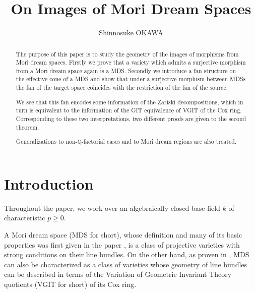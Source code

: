 \documentclass[12pt,twoside]{amsart}
\theoremstyle{definition}
\newcommand\bq{\mathbb{Q}}
\begin{document}
 \title[]{On Images of Mori Dream Spaces}
 \author{Shinnosuke OKAWA}
 \address{Graduate School of Mathematical Sciences, 
the University of Tokyo, 3-8-1 Komaba, Meguro-ku, Tokyo 153-8914, Japan.}
\date{}



\maketitle
 
 \begin{abstract}
  The purpose of this paper is to study the geometry of the images of morphisms from Mori dream spaces.  
  Firstly we prove that a variety which admits a surjective morphism from a Mori dream space again is a MDS.
  Secondly we introduce a fan structure on the effective cone of a MDS
  and show that under a surjective morphism between MDSs the fan of the target space coincides with the
  restriction of the fan of the source.
  
  We see that this fan encodes some information of the Zariski decompositions, which
  in turn is equivalent to the information of the GIT equivalence of VGIT of the Cox ring.
  Corresponding to these two interpretations, two different proofs are given to the
  second theorem.
  
  Generalizations to non-$\bq$-factorial cases and to Mori dream regions are also treated.
 \end{abstract}

\tableofcontents




\section{Introduction}
Throughout the paper, we work over an algebraically closed base field $k$ of characteristic
$p\ge 0$.


A Mori dream space (MDS for short), whose definition and many of its basic properties was first given
in the paper \cite{hk}, is a class of projective varieties with strong conditions on their line bundles.
On the other hand, as proven in \cite{hk}, MDS can also be characterized as a class of varieties
whose geometry of line bundles can be described
in terms of the Variation of Geometric Invariant Theory quotients (VGIT for short) of its Cox ring.
\end{document}
